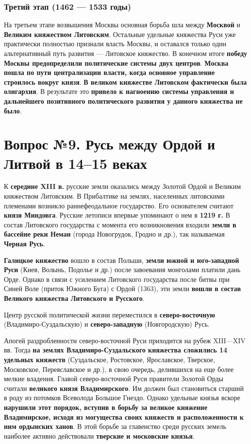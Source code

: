 \documentclass{article}
\begin{document}
\subsubsection{Третий этап (1462 — 1533 годы)}

На третьем этапе возвышения Москвы основная борьба шла между \textbf{Москвой} и \textbf{Великим княжеством Литовским}. Остальные удельные княжества Руси уже практически полностью признали власть Москвы, и оставался только один альтернативный путь развития — Литовское княжество. В конечном итоге \textbf{победу Москвы предопределили политические системы двух центров}. \textbf{Москва пошла по пути централизации власти, когда основное управление строилось вокруг князя}. \textbf{В великом княжестве Литовском фактически была олигархия}. В результате это \textbf{привело к нагноению системы управления и дальнейшего позитивного политического развития у данного княжества не было}.

\pagebreak
\section{Вопрос №9. Русь между Ордой и Литвой в 14–15 веках}

К \textbf{середине XIII в.} русские земли оказались между Золотой Ордой и Великим княжеством Литовским. В Прибалтике на землях, населенных литовскими племенами возникло раннефеодальное государство. Его основателем считают \textbf{князя Миндовга}. Русские летописи впервые упоминают о нем в \textbf{1219 г.} В состав Литовского государства с момента его возникновения входили \textbf{земли в бассейне реки Неман} (города Новогрудок, Гродно и др.), так называемая \textbf{Черная Русь}.

\hfill

\textbf{Галицкое княжество} вошло в состав Польши, \textbf{земли южной и юго-западной Руси} (Киев, Волынь, Подолье и др.) после завоевания монголами платили дань Орде. Однако в связи с усилением Литовского государства после битвы при Синей Воле (приток Южного Буга) с Ордой (1363), эти земли \textbf{вошли в состав Великого княжества Литовского и Русского}.

\hfill

Центр русской политической жизни переместился в \textbf{северо-восточную} (Владимиро-Суздальскую) и \textbf{северо-западную} (Новгородскую) Русь.

\hfill

Апогей раздробленности северо-восточной Руси приходится на рубеж XIII—XIV вв. Тогда \textbf{на землях Владимиро-Суздальского княжества сложились 14 удельных княжеств} (Суздальское, Ростовское, Ярославское, Тверское, Московское, Переяславское и др.), в свою очередь, делившихся на еще более мелкие владения. Главой северо-восточной Руси правители Золотой Орды считали \textbf{великого князя Владимирского}. Им должен был становиться старший в роду из потомков Всеволода Большое Гнездо. Однако удельные князья вскоре \textbf{нарушили этот порядок, вступив в борьбу за великое княжение Владимирское, исходя из могущества своих княжеств и расположенности к ним ордынских ханов}. В этой борьбе за главенство среди русских земель наиболее активно действовали \textbf{тверские и московские князья}.
\end{document}
